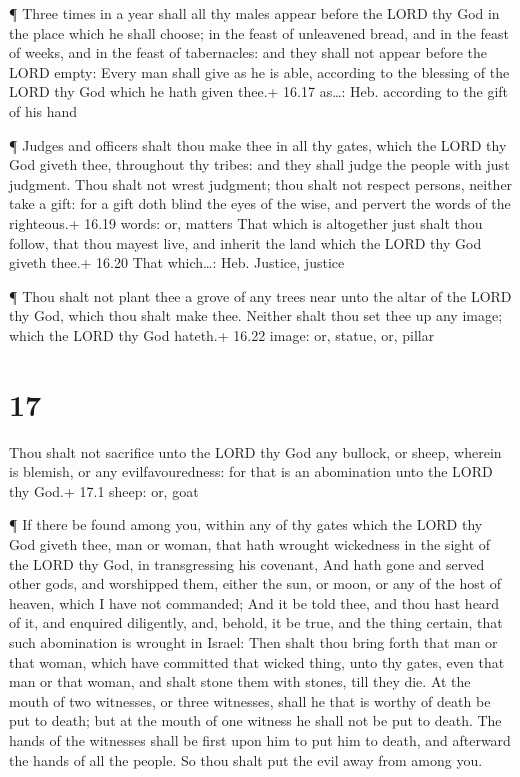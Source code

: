  ¶ Three times in a year shall all thy males appear before
the LORD thy God in the place which he shall choose; in the feast of
unleavened bread, and in the feast of weeks, and in the feast of
tabernacles: and they shall not appear before the LORD empty:
 Every man shall give as he is able, according to the
blessing of the LORD thy God which he hath given thee.+ 16.17 as\ldots:
Heb. according to the gift of his hand

 ¶ Judges and officers shalt thou make thee in all thy
gates, which the LORD thy God giveth thee, throughout thy tribes: and
they shall judge the people with just judgment.  Thou shalt
not wrest judgment; thou shalt not respect persons, neither take a gift:
for a gift doth blind the eyes of the wise, and pervert the words of the
righteous.+ 16.19 words: or, matters  That which is
altogether just shalt thou follow, that thou mayest live, and inherit
the land which the LORD thy God giveth thee.+ 16.20 That which\ldots:
Heb. Justice, justice

 ¶ Thou shalt not plant thee a grove of any trees near unto
the altar of the LORD thy God, which thou shalt make thee. 
Neither shalt thou set thee up any image; which the LORD thy God
hateth.+ 16.22 image: or, statue, or, pillar

\hypertarget{section-16}{%
\section{17}\label{section-16}}

 Thou shalt not sacrifice unto the LORD thy God any bullock,
or sheep, wherein is blemish, or any evilfavouredness: for that is an
abomination unto the LORD thy God.+ 17.1 sheep: or, goat

 ¶ If there be found among you, within any of thy gates
which the LORD thy God giveth thee, man or woman, that hath wrought
wickedness in the sight of the LORD thy God, in transgressing his
covenant,  And hath gone and served other gods, and
worshipped them, either the sun, or moon, or any of the host of heaven,
which I have not commanded;  And it be told thee, and thou
hast heard of it, and enquired diligently, and, behold, it be true, and
the thing certain, that such abomination is wrought in Israel:
 Then shalt thou bring forth that man or that woman, which
have committed that wicked thing, unto thy gates, even that man or that
woman, and shalt stone them with stones, till they die.  At
the mouth of two witnesses, or three witnesses, shall he that is worthy
of death be put to death; but at the mouth of one witness he shall not
be put to death.  The hands of the witnesses shall be first
upon him to put him to death, and afterward the hands of all the people.
So thou shalt put the evil away from among you.

